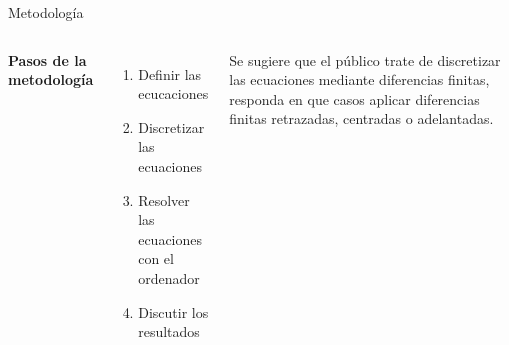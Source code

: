 \begin{frame}{Metodología}
\begin{columns}[c] %

\textbf{Pasos de la metodología}
\begin{enumerate}
\item Definir las ecucaciones
\item Discretizar las ecuaciones
\item Resolver las ecuaciones con el ordenador
\item Discutir los resultados
\end{enumerate}

Se sugiere que el público trate de discretizar las ecuaciones mediante diferencias finitas, responda en que casos aplicar diferencias finitas retrazadas, centradas o adelantadas.

\end{columns}
\end{frame}